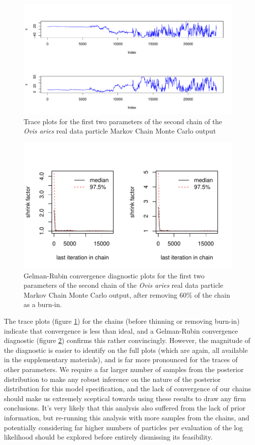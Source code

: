 \documentclass[a4paper,12pt]{article}
\begin{document}
\begin{figure}[H]
\centering
\includegraphics[scale=0.6]{chainFirst2_1.PDF}
\caption{\label{sheepTrace}Trace plots for the first two parameters of the second chain of the \textit{Ovis aries} real data particle Markov Chain Monte Carlo output}
\end{figure}

\begin{figure}[H]
\centering
\includegraphics[scale=0.7]{GrFirst2.pdf}
\caption{\label{GRsheep}Gelman-Rubin convergence diagnostic plots for the first two parameters of the second chain of the \textit{Ovis aries} real data particle Markov Chain Monte Carlo output, after removing 60\% of the chain as a burn-in.}
\end{figure}

The trace plots (figure \ref{sheepTrace}) for the chains (before thinning or removing burn-in) indicate that convergence is less than ideal, and a Gelman-Rubin convergence diagnostic (figure \ref{GRsheep}) confirms this rather convincingly. However, the magnitude of the diagnostic is easier to identify on the full plots (which are again, all available in the supplementary materials), and is far more pronounced for the traces of other parameters. We require a far larger number of samples from the posterior distribution to make any robust inference on the nature of the posterior distribution for this model specification, and the lack of convergence of our chains should make us extremely sceptical towards using these results to draw any firm conclusions. It's very likely that this analysis also suffered from the lack of prior information, but re-running this analysis with more samples from the chains, and potentially considering far higher numbers of particles per evaluation of the log likelihood should be explored before entirely dismissing its feasibility.
\end{document}
